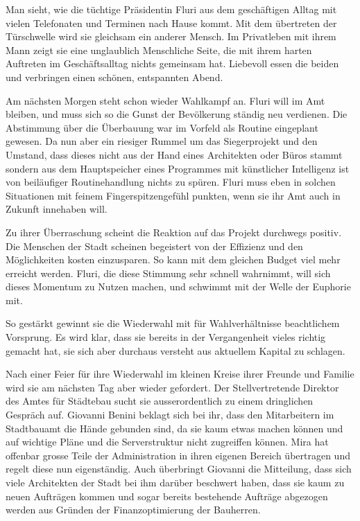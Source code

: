 \documentclass[11pt,a4paper,ngerman]{scrreprt}
\begin{document}
Man sieht, wie die tüchtige Präsidentin Fluri aus dem geschäftigen Alltag mit
vielen Telefonaten und Terminen nach Hause kommt. Mit dem übertreten der
Türschwelle wird sie gleichsam ein anderer Mensch. Im Privatleben mit ihrem Mann
zeigt sie eine unglaublich Menschliche Seite, die mit ihrem harten Auftreten im
Geschäftsalltag nichts gemeinsam hat. Liebevoll essen die beiden und verbringen
einen schönen, entspannten Abend.

Am nächsten Morgen steht schon wieder Wahlkampf an. Fluri will im Amt
bleiben, und muss sich so die Gunst der Bevölkerung ständig neu verdienen. Die
Abstimmung über die Überbauung war im Vorfeld als Routine eingeplant gewesen. Da
nun aber ein riesiger Rummel um das Siegerprojekt und den Umstand, dass dieses
nicht aus der Hand eines Architekten oder Büros stammt sondern aus dem
Hauptspeicher eines Programmes mit künstlicher Intelligenz ist von beiläufiger
Routinehandlung nichts zu spüren. Fluri muss eben in solchen Situationen mit
feinem Fingerspitzengefühl punkten, wenn sie ihr Amt auch in Zukunft innehaben
will.

Zu ihrer Überraschung scheint die Reaktion auf das Projekt durchwegs
positiv. Die Menschen der Stadt scheinen begeistert von der Effizienz und den
Möglichkeiten kosten einzusparen. So kann mit dem gleichen Budget viel mehr
erreicht werden. Fluri, die diese Stimmung sehr schnell wahrnimmt, will sich
dieses Momentum zu Nutzen machen, und schwimmt mit der Welle der Euphorie mit.

So gestärkt gewinnt sie die Wiederwahl mit für Wahlverhältnisse beachtlichem
Vorsprung. Es wird klar, dass sie bereits in der Vergangenheit vieles richtig
gemacht hat, sie sich aber durchaus versteht aus aktuellem Kapital zu schlagen.

Nach einer Feier für ihre Wiederwahl im kleinen Kreise ihrer Freunde und Familie
wird sie am nächsten Tag aber wieder gefordert. Der Stellvertretende Direktor
des Amtes für Städtebau sucht sie ausserordentlich zu einem dringlichen Gespräch
auf. Giovanni Benini beklagt sich bei ihr, dass den Mitarbeitern im Stadtbauamt
die Hände gebunden sind, da sie kaum etwas machen können und auf wichtige Pläne
und die Serverstruktur nicht zugreiffen können. Mira hat offenbar grosse Teile
der Administration in ihren eigenen Bereich übertragen und regelt diese nun
eigenständig. Auch überbringt Giovanni die Mitteilung, dass sich viele
Architekten der Stadt bei ihm darüber beschwert haben, dass sie kaum zu neuen
Aufträgen kommen und sogar bereits bestehende Aufträge abgezogen werden aus
Gründen der Finanzoptimierung der Bauherren.
\end{document}
